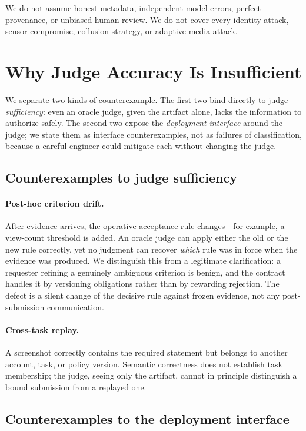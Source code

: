 \documentclass[sigconf,anonymous,review]{acmart}
\begin{document}
We do not assume honest metadata, independent model errors, perfect provenance, or unbiased human review. We do not cover every identity attack, sensor compromise, collusion strategy, or adaptive media attack.

\section{Why Judge Accuracy Is Insufficient}
We separate two kinds of counterexample. The first two bind directly to judge \emph{sufficiency}: even an oracle judge, given the artifact alone, lacks the information to authorize safely. The second two expose the \emph{deployment interface} around the judge; we state them as interface counterexamples, not as failures of classification, because a careful engineer could mitigate each without changing the judge.

\subsection{Counterexamples to judge sufficiency}
\paragraph{Post-hoc criterion drift.} After evidence arrives, the operative acceptance rule changes---for example, a view-count threshold is added. An oracle judge can apply either the old or the new rule correctly, yet no judgment can recover \emph{which} rule was in force when the evidence was produced. We distinguish this from a legitimate clarification: a requester refining a genuinely ambiguous criterion is benign, and the contract handles it by versioning obligations rather than by rewarding rejection. The defect is a silent change of the decisive rule against frozen evidence, not any post-submission communication.

\paragraph{Cross-task replay.} A screenshot correctly contains the required statement but belongs to another account, task, or policy version. Semantic correctness does not establish task membership; the judge, seeing only the artifact, cannot in principle distinguish a bound submission from a replayed one.

\subsection{Counterexamples to the deployment interface}
\end{document}
